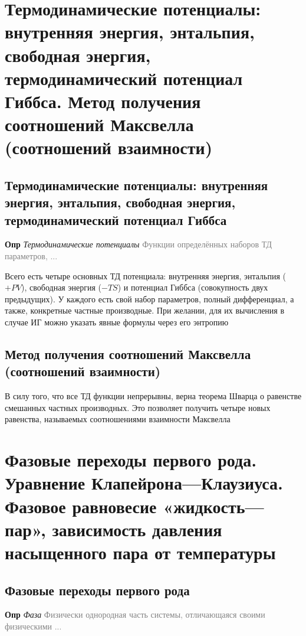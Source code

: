 \documentclass[a4paper, 14pt]{article}
\begin{document}
    \section{Термодинамические потенциалы: внутренняя энергия, энтальпия, свободная энергия, термодинамический
    потенциал Гиббса.
    Метод получения соотношений Максвелла (соотношений взаимности)}

    \subsection{Термодинамические потенциалы: внутренняя энергия, энтальпия, свободная энергия, термодинамический
    потенциал Гиббса}

    \textbf{Опр} \textit{Термодинамические потенциалы} \textcolor{gray}{Функции определённых наборов ТД параметров, ...}

    Всего есть четыре основных ТД потенциала: внутренняя энергия, энтальпия ($+PV$), свободная энергия ($-TS$) и
    потенциал Гиббса (совокупность двух предыдущих).
    У каждого есть свой набор параметров, полный дифференциал, а также, конкретные частные производные.
    При желании, для их вычисления в случае ИГ можно указать явные формулы через его энтропию

    \subsection{Метод получения соотношений Максвелла (соотношений взаимности)}

    В силу того, что все ТД функции непрерывны, верна теорема Шварца о равенстве смешанных частных производных.
    Это позволяет получить четыре новых равенства, называемых соотношениями взаимности Максвелла

    \section{Фазовые переходы первого рода.
    Уравнение Клапейрона—Клаузиуса.
    Фазовое равновесие «жидкость—пар», зависимость давления насыщенного пара от температуры}

    \subsection{Фазовые переходы первого рода}

    \textbf{Опр} \textit{Фаза} \textcolor{gray}{Физически однородная часть системы, отличающаяся своими физическими ...}
\end{document}
